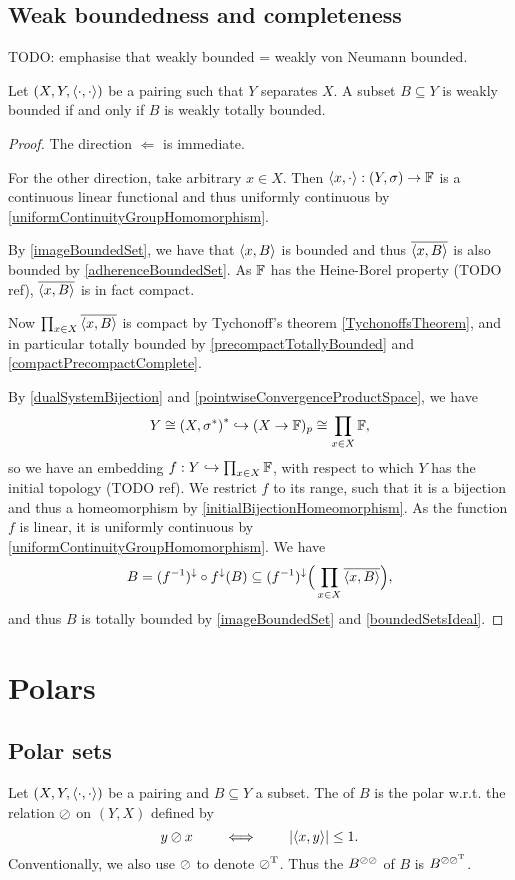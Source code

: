 \subsection{Weak boundedness and completeness}
TODO: emphasise that weakly bounded = weakly von Neumann bounded.


\begin{proposition} \label{weakBoundedness}
Let $\sSet{X,Y,\pair{\cdot,\cdot}}$ be a pairing such that $Y$ separates $X$. A subset $B\subseteq Y$ is weakly bounded \textup{if and only if} $B$ is weakly totally bounded.
\end{proposition}
\begin{proof}
The direction $\Leftarrow$ is immediate.

For the other direction, take arbitrary $x\in X$. Then $\pair{x,\cdot}: \sSet{Y,\sigma}\to \F$ is a continuous linear functional and thus uniformly continuous by \ref{uniformContinuityGroupHomomorphism}. 

By \ref{imageBoundedSet}, we have that $\left\langle x, B \right\rangle$ is bounded and thus $\overline{\left\langle x,B \right\rangle}$ is also bounded by \ref{adherenceBoundedSet}. As $\mathbb{F}$ has the Heine-Borel property (TODO ref), $\overline{\left\langle x,B \right\rangle}$ is in fact compact.

Now $\prod_{x\in X}\overline{\left\langle x, B \right\rangle}$ is compact by Tychonoff's theorem \ref{TychonoffsTheorem}, and in particular totally bounded by \ref{precompactTotallyBounded} and \ref{compactPrecompactComplete}.

By \ref{dualSystemBijection} and \ref{pointwiseConvergenceProductSpace}, we have
\[ Y \cong \sSet{X,\sigma^*}^* \hookrightarrow (X\to \F)_p \cong \prod_{x\in X}\F, \]
so we have an embedding $f: Y \hookrightarrow \prod_{x\in X}\mathbb{F}$, with respect to which $Y$ has the initial topology (TODO ref). We restrict $f$ to its range, such that it is a bijection and thus a homeomorphism by \ref{initialBijectionHomeomorphism}. As the function $f$ is linear, it is uniformly continuous by \ref{uniformContinuityGroupHomomorphism}.
We have
\[ B = (f^{-1})^\downarrow\circ f^\downarrow(B) \subseteq (f^{-1})^\downarrow\Big(\prod_{x\in X}\overline{\left\langle x, B \right\rangle}\Big), \]
and thus $B$ is totally bounded by \ref{imageBoundedSet} and \ref{boundedSetsIdeal}.
\end{proof}

\section{Polars}
\subsection{Polar sets}
\begin{definition}
Let $\sSet{X,Y,\pair{\cdot,\cdot}}$ be a pairing and $B\subseteq Y$ a subset. The  of $B$ is the polar w.r.t. the relation $\oslash$ on $(Y,X)$ defined by
\[ y\oslash x \qquad\iff\qquad \left|\left\langle x, y \right\rangle\right| \leq 1. \]
Conventionally, we also use $\oslash$ to denote $\oslash^{\mathrm{T}}$. Thus the  $B^{\oslash\oslash}$ of $B$ is $B^{\oslash\oslash^{\mathrm{T}}}$.
\end{definition}

